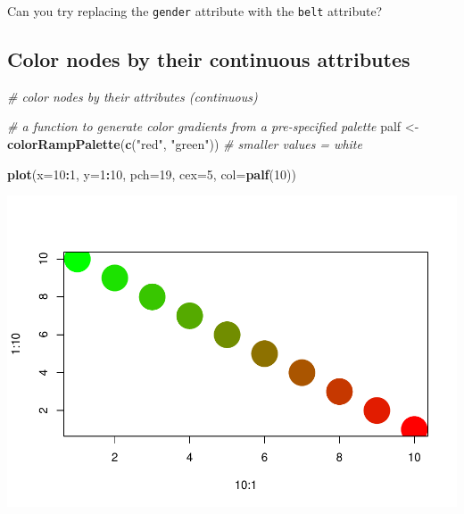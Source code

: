 \documentclass[
]{book}
\newenvironment{Shaded}{\begin{snugshade}}{\end{snugshade}}
\newcommand{\AttributeTok}[1]{\textcolor[rgb]{0.13,0.29,0.53}{#1}}
\newcommand{\CommentTok}[1]{\textcolor[rgb]{0.56,0.35,0.01}{\textit{#1}}}
\newcommand{\DecValTok}[1]{\textcolor[rgb]{0.00,0.00,0.81}{#1}}
\newcommand{\FunctionTok}[1]{\textcolor[rgb]{0.13,0.29,0.53}{\textbf{#1}}}
\newcommand{\NormalTok}[1]{#1}
\newcommand{\OtherTok}[1]{\textcolor[rgb]{0.56,0.35,0.01}{#1}}
\newcommand{\SpecialCharTok}[1]{\textcolor[rgb]{0.81,0.36,0.00}{\textbf{#1}}}
\newcommand{\StringTok}[1]{\textcolor[rgb]{0.31,0.60,0.02}{#1}}
\begin{document}
Can you try replacing the \texttt{gender} attribute with the \texttt{belt} attribute?

\subsection{Color nodes by their continuous attributes}\label{color-nodes-by-their-continuous-attributes}

\begin{Shaded}
\begin{Highlighting}[]
\CommentTok{\# color nodes by their attributes (continuous) }

\CommentTok{\# a function to generate color gradients from a pre{-}specified palette }
\NormalTok{palf }\OtherTok{\textless{}{-}} \FunctionTok{colorRampPalette}\NormalTok{(}\FunctionTok{c}\NormalTok{(}\StringTok{"red"}\NormalTok{, }\StringTok{"green"}\NormalTok{)) }\CommentTok{\# smaller values = white }

\FunctionTok{plot}\NormalTok{(}\AttributeTok{x=}\DecValTok{10}\SpecialCharTok{:}\DecValTok{1}\NormalTok{, }\AttributeTok{y=}\DecValTok{1}\SpecialCharTok{:}\DecValTok{10}\NormalTok{, }\AttributeTok{pch=}\DecValTok{19}\NormalTok{, }\AttributeTok{cex=}\DecValTok{5}\NormalTok{, }\AttributeTok{col=}\FunctionTok{palf}\NormalTok{(}\DecValTok{10}\NormalTok{))}
\end{Highlighting}
\end{Shaded}

\includegraphics{bookdown-demo_files/figure-latex/unnamed-chunk-127-1.pdf}

\begin{Shaded}
\end{Shaded}
\end{document}
